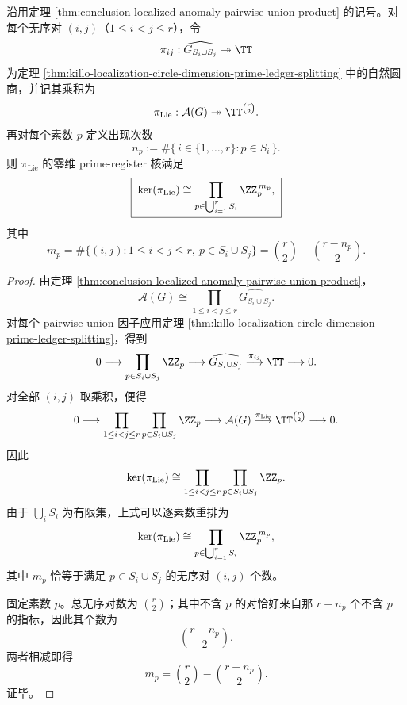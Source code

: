 \begin{theorem}\label{thm:conclusion-localized-anomaly-prime-ledger-multiplicity}
沿用定理 \ref{thm:conclusion-localized-anomaly-pairwise-union-product} 的记号。对每个无序对 \((i,j)\)（\(1\le i<j\le r\)），令
\[
\pi_{ij}:\widehat{G_{S_i\cup S_j}}\twoheadrightarrow \TT
\]
为定理 \ref{thm:killo-localization-circle-dimension-prime-ledger-splitting} 中的自然圆商，并记其乘积为
\[
\pi_{\mathrm{Lie}}:\mathcal A(G)\twoheadrightarrow \TT^{\binom r2}.
\]
再对每个素数 \(p\) 定义出现次数
\[
n_p:=\#\{\,i\in\{1,\dots,r\}: p\in S_i\,\}.
\]
则 \(\pi_{\mathrm{Lie}}\) 的零维 prime-register 核满足
\[
\boxed{\;
\ker(\pi_{\mathrm{Lie}})
\cong
\prod_{p\in \bigcup_{i=1}^r S_i}\ZZ_p^{\,m_p},\;}
\]
其中
\[
\boxed{\;
m_p
=
\#\bigl\{(i,j):1\le i<j\le r,\ p\in S_i\cup S_j\bigr\}
=
\binom r2-\binom{r-n_p}{2}.\;}
\]
\end{theorem}
\begin{proof}
由定理 \ref{thm:conclusion-localized-anomaly-pairwise-union-product}，
\[
\mathcal A(G)\cong \prod_{1\le i<j\le r}\widehat{G_{S_i\cup S_j}}.
\]
对每个 pairwise-union 因子应用定理 \ref{thm:killo-localization-circle-dimension-prime-ledger-splitting}，得到
\[
0\longrightarrow \prod_{p\in S_i\cup S_j}\ZZ_p
\longrightarrow
\widehat{G_{S_i\cup S_j}}
\overset{\pi_{ij}}{\longrightarrow}
\TT
\longrightarrow 0.
\]
对全部 \((i,j)\) 取乘积，便得
\[
0\longrightarrow
\prod_{1\le i<j\le r}\prod_{p\in S_i\cup S_j}\ZZ_p
\longrightarrow
\mathcal A(G)
\overset{\pi_{\mathrm{Lie}}}{\longrightarrow}
\TT^{\binom r2}
\longrightarrow 0.
\]
因此
\[
\ker(\pi_{\mathrm{Lie}})
\cong
\prod_{1\le i<j\le r}\prod_{p\in S_i\cup S_j}\ZZ_p.
\]
由于 \(\bigcup_iS_i\) 为有限集，上式可以逐素数重排为
\[
\ker(\pi_{\mathrm{Lie}})
\cong
\prod_{p\in \bigcup_{i=1}^rS_i}\ZZ_p^{\,m_p},
\]
其中 \(m_p\) 恰等于满足 \(p\in S_i\cup S_j\) 的无序对 \((i,j)\) 个数。

固定素数 \(p\)。总无序对数为 \(\binom r2\)；其中不含 \(p\) 的对恰好来自那 \(r-n_p\) 个不含 \(p\) 的指标，因此其个数为
\[
\binom{r-n_p}{2}.
\]
两者相减即得
\[
m_p=\binom r2-\binom{r-n_p}{2}.
\]
证毕。
\end{proof}

